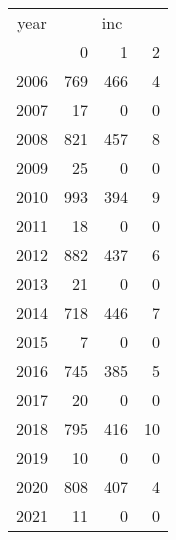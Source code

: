\footnotesize\begin{tabular}[t]{lrrr}
\toprule
\multicolumn{1}{c}{year} & \multicolumn{3}{c}{inc} \\
\cmidrule(l{3pt}r{3pt}){1-1} \cmidrule(l{3pt}r{3pt}){2-4}
  & 0 & 1 & 2\\
\midrule
2006 & 769 & 466 & 4\\
2007 & 17 & 0 & 0\\
2008 & 821 & 457 & 8\\
2009 & 25 & 0 & 0\\
2010 & 993 & 394 & 9\\
2011 & 18 & 0 & 0\\
2012 & 882 & 437 & 6\\
2013 & 21 & 0 & 0\\
2014 & 718 & 446 & 7\\
2015 & 7 & 0 & 0\\
2016 & 745 & 385 & 5\\
2017 & 20 & 0 & 0\\
2018 & 795 & 416 & 10\\
2019 & 10 & 0 & 0\\
2020 & 808 & 407 & 4\\
2021 & 11 & 0 & 0\\
\bottomrule
\end{tabular}
